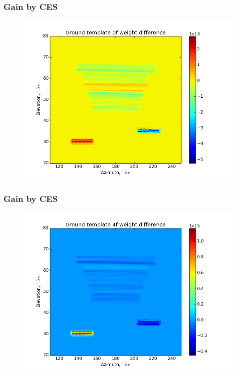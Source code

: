 \documentclass{beamer}
\begin{document}
\begin{frame}
\frametitle{Gain by CES}
\begin{figure}
\includegraphics[width=0.9\linewidth]{dw0_gt_GAIN_BY_CES.png}
\end{figure}
\end{frame}

\begin{frame}
\frametitle{Gain by CES}
\begin{figure}
\includegraphics[width=0.9\linewidth]{dw4_gt_GAIN_BY_CES.png}
\end{figure}
\end{frame}
\end{document}
